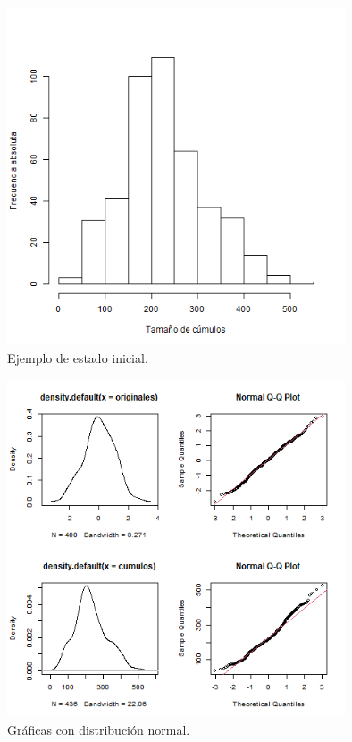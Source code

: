 \documentclass{article}
\begin{document}
\begin{figure} [h!]%
\renewcommand{\figurename}{Gráfica}
    \centering
    \caption{ Ejemplo de estado inicial.}
    \label{grafica4}
    \includegraphics[width=100mm]{grafica4.png} %
\end{figure}

\begin{figure} [h!]%
\renewcommand{\figurename}{Gráfica}
    \centering
    \caption{ Gráficas con distribución normal.}
    \label{grafica5}
    \includegraphics[width=100mm]{grafica5.png} %
\end{figure}

\newpage
\end{document}
